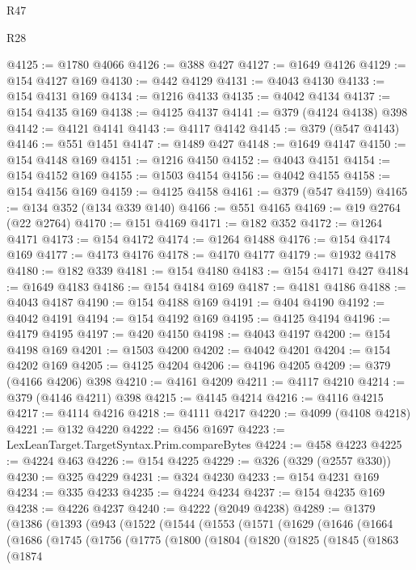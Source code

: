 \begin{lexlean}{R47}
\begin{lexlean}{R28}
\begin{coremodule}
{{{{{{{{{{{{{{{{{{{{{{{{{{{{{{{{{{{{{{{{{{{{{{{{{{{{{{{{{{{{{{{{{{{{{{{{{{{{{{{{{{{{{{{{{{{{{{{{{{{{{{{{{{{{{{{{{{{{{{{{{{{{{{{{{{{{{@4125 := @1780 @4066
@4126 := @388 @427
@4127 := @1649 @4126
@4129 := @154 @4127 @169
@4130 := @442 @4129
@4131 := @4043 @4130
@4133 := @154 @4131 @169
@4134 := @1216 @4133
@4135 := @4042 @4134
@4137 := @154 @4135 @169
@4138 := @4125 @4137
@4141 := @379 (@4124 @4138) @398
@4142 := @4121 @4141
@4143 := @4117 @4142
@4145 := @379 (@547 @4143)
@4146 := @551 @1451
@4147 := @1489 @427
@4148 := @1649 @4147
@4150 := @154 @4148 @169
@4151 := @1216 @4150
@4152 := @4043 @4151
@4154 := @154 @4152 @169
@4155 := @1503 @4154
@4156 := @4042 @4155
@4158 := @154 @4156 @169
@4159 := @4125 @4158
@4161 := @379 (@547 @4159)
@4165 := @134 @352 (@134 @339 @140)
@4166 := @551 @4165
@4169 := @19 @2764 (@22 @2764)
@4170 := @151 @4169
@4171 := @182 @352
@4172 := @1264 @4171
@4173 := @154 @4172
@4174 := @1264 @1488
@4176 := @154 @4174 @169
@4177 := @4173 @4176
@4178 := @4170 @4177
@4179 := @1932 @4178
@4180 := @182 @339
@4181 := @154 @4180
@4183 := @154 @4171 @427
@4184 := @1649 @4183
@4186 := @154 @4184 @169
@4187 := @4181 @4186
@4188 := @4043 @4187
@4190 := @154 @4188 @169
@4191 := @404 @4190
@4192 := @4042 @4191
@4194 := @154 @4192 @169
@4195 := @4125 @4194
@4196 := @4179 @4195
@4197 := @420 @4150
@4198 := @4043 @4197
@4200 := @154 @4198 @169
@4201 := @1503 @4200
@4202 := @4042 @4201
@4204 := @154 @4202 @169
@4205 := @4125 @4204
@4206 := @4196 @4205
@4209 := @379 (@4166 @4206) @398
@4210 := @4161 @4209
@4211 := @4117 @4210
@4214 := @379 (@4146 @4211) @398
@4215 := @4145 @4214
@4216 := @4116 @4215
@4217 := @4114 @4216
@4218 := @4111 @4217
@4220 := @4099 (@4108 @4218)
@4221 := @132 @4220
@4222 := @456 @1697
@4223 := LexLeanTarget.TargetSyntax.Prim.compareBytes
@4224 := @458 @4223
@4225 := @4224 @463
@4226 := @154 @4225
@4229 := @326 (@329 (@2557 @330))
@4230 := @325 @4229
@4231 := @324 @4230
@4233 := @154 @4231 @169
@4234 := @335 @4233
@4235 := @4224 @4234
@4237 := @154 @4235 @169
@4238 := @4226 @4237
@4240 := @4222 (@2049 @4238)
@4289 := @1379
    (@1386
      (@1393
        (@943
          (@1522
            (@1544
              (@1553
                (@1571
                  (@1629
                    (@1646
                      (@1664
                        (@1686
                          (@1745
                            (@1756
                              (@1775
                                (@1800
                                  (@1804
                                    (@1820
                                      (@1825
                                        (@1845
                                          (@1863
                                            (@1874
}}}}}}}}}}}}}}}}}}}}}}}}}}}}}}}}}}}}}}}}}}}}}}}}}}}}}}}}}}}}}}}}}}}}}}}}}}}}}}}}}}}}}}}}}}}}}}}}}}}}}}}}}}}}}}}}}}}}}}}}}}}}}}}}}}}}}
\end{coremodule}
\end{lexlean}
\end{lexlean}
